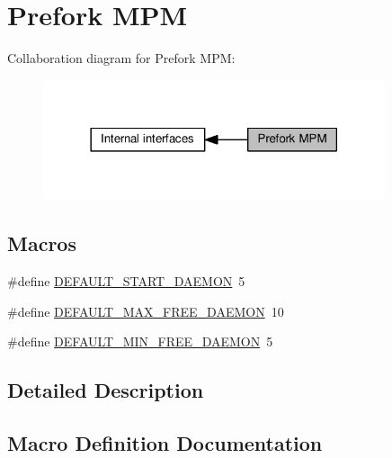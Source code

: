 \hypertarget{group__APACHE__MPM__PREFORK}{}\section{Prefork M\+PM}
\label{group__APACHE__MPM__PREFORK}
Collaboration diagram for Prefork M\+PM\+:
\nopagebreak
\begin{figure}[H]
\begin{center}
\leavevmode
\includegraphics[width=285pt]{group__APACHE__MPM__PREFORK}
\end{center}
\end{figure}
\subsection*{Macros}
\begin{DoxyCompactItemize}
\item 
\#define \hyperlink{group__APACHE__MPM__PREFORK_gac3950e57f9e8a7cfe6ff3fa67237e604}{D\+E\+F\+A\+U\+L\+T\+\_\+\+S\+T\+A\+R\+T\+\_\+\+D\+A\+E\+M\+ON}~5
\item 
\#define \hyperlink{group__APACHE__MPM__PREFORK_ga77abf0320697e196e2d1d282cca9ad44}{D\+E\+F\+A\+U\+L\+T\+\_\+\+M\+A\+X\+\_\+\+F\+R\+E\+E\+\_\+\+D\+A\+E\+M\+ON}~10
\item 
\#define \hyperlink{group__APACHE__MPM__PREFORK_gabfe5932653591d3339a6620cbd0d40be}{D\+E\+F\+A\+U\+L\+T\+\_\+\+M\+I\+N\+\_\+\+F\+R\+E\+E\+\_\+\+D\+A\+E\+M\+ON}~5
\end{DoxyCompactItemize}


\subsection{Detailed Description}


\subsection{Macro Definition Documentation}
